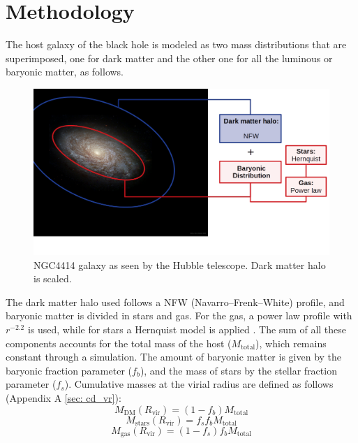 
%





\chapter{Methodology}\label{ch: methodology}
	The host galaxy of the black hole is modeled as two mass distributions that are superimposed, one for dark matter and the other one for all the luminous or baryonic matter, as follows.
	\begin{figure}[h]
		\centering
		\includegraphics[width=0.8\linewidth]{Figures/NGC4414_modified}
		\caption{NGC4414 galaxy as seen by the Hubble telescope. Dark matter halo is scaled.}
	\end{figure}
	
	The dark matter halo used follows a NFW (Navarro–Frenk–White) profile, and baryonic matter is divided in stars and gas. For the gas, a power law profile with $r^{-2.2}$ is used, while for stars a Hernquist model is applied \cite{tanaka2009assembly, choksi2017recoiling}. The sum of all these components accounts for the total mass of the host ($M_\text{total}$), which remains constant through a simulation. The amount of baryonic matter is given by the baryonic fraction parameter ($f_b$), and the mass of stars by the stellar fraction parameter ($f_s$). Cumulative masses at the virial radius are defined as follows (Appendix A \autoref{sec: cd_vr}):
	\begin{equation}
		M_\text{DM}(R_\text{vir}) = (1 - f_b)M_\text{total}
	\end{equation}
	\begin{equation}
		M_\text{stars}(R_\text{vir}) = f_sf_bM_\text{total}
	\end{equation}
	\begin{equation}
		M_\text{gas}(R_\text{vir}) = (1 - f_s)f_bM_\text{total}
	\end{equation}
	

